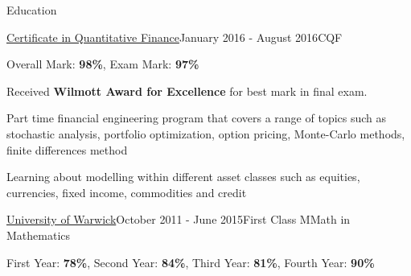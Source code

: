 \documentclass{resume} %
\begin{document}

\begin{rSection}{Education}
	\begin{rSubsection}{\href{https://www.cqf.com/}{Certificate in Quantitative Finance}}{January 2016 - August 2016}{CQF}{}
		\item Overall Mark: {\bf 98\%}, Exam Mark: {\bf 97\%}
		\item Received {\bf Wilmott Award for Excellence} for best mark in final exam.
		\item Part time financial engineering program that covers a range of topics such as stochastic analysis, portfolio optimization, option pricing, Monte-Carlo methods, finite differences method
		\item Learning about modelling within different asset classes such as equities, currencies, fixed income, commodities and credit
	\end{rSubsection}
	\begin{rSubsection}{\href{https://warwick.ac.uk/fac/sci/maths/}{University of Warwick}}{October 2011 - June 2015}{First Class MMath in Mathematics}{}
		\item First Year: {\bf 78\%},  %
		Second Year: {\bf 84\%},  %
		Third Year: {\bf 81\%}, %
		Fourth Year: {\bf 90\%} %
		\iffalse		
		\item  Relevant modules: Stochastic Analysis, Brownian Motion, Uncertainty Quantification, Data Assimilation, Matrix Analysis \& Algorithms and High Performance Computing
		\item Fourth year project entitled Asynchronous Parallel Numerical Optimization. Utilised parallel computing in Matlab. Designed and implemented an algorithm for function optimization based on genetic algorithms
		\item Warwick Mathematics Society - contributed by composing revision guides for over 800 students, running LaTeX workshops and revision lectures for over 300 students. Warwick Poker Society - developed a new website and taught members about analytical strategies
		\fi
	\end{rSubsection}
	\iffalse
	\begin{rSubsection}{The Latymer School}{ September 2004 - June 2011}{Secondary School}{}
		\item A-Levels: Mathematics ({\bf A*}), Further Mathematics ({\bf A*}), Physics ({\bf A}) 
		\item AS-Levels: Economics ({\bf A}), Additional Further Mathematics ({\bf A}) 
		\item GCSEs: 4 {\bf A*s}, 4 {\bf As} and 1 {\bf B}
	\end{rSubsection}
	\fi
\end{rSection}
\end{document}
